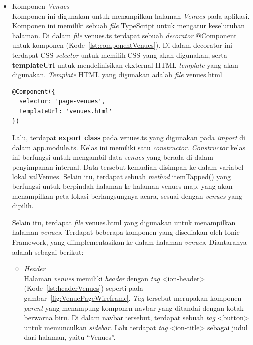 \begin{itemize}
\begin{itemize}
	\end{itemize}

	\item Komponen \textit{Venues} \\
	Komponen ini digunakan untuk menampilkan halaman \textit{Venues} pada aplikasi. Komponen ini memiliki sebuah \textit{file} TypeScript untuk mengatur keseluruhan halaman. Di dalam \textit{file} venues.ts terdapat sebuah \textit{decorator} @Component untuk komponen (Kode~\ref{lst:componentVenues}). Di dalam decorator ini terdapat CSS \textit{selector} untuk memilih CSS yang akan digunakan, serta \textbf{templateUrl} untuk mendefinisikan ekxternal HTML \textit{template} yang akan digunakan. \textit{Template} HTML yang digunakan adalah \textit{file} venues.html
	
\begin{lstlisting}[language=html, label={lst:componentVenues}, caption=@Component pada venues.ts]
@Component({
  selector: 'page-venues',
  templateUrl: 'venues.html'
})
\end{lstlisting}

	Lalu, terdapat \textbf{export class} pada venues.ts yang digunakan pada \textit{import} di dalam app.module.ts. Kelas ini memiliki satu \textit{constructor}. \textit{Constructor} kelas ini berfungsi untuk mengambil data \textit{venues} yang berada di dalam penyimpanan internal. Data tersebut kemudian disimpan ke dalam variabel lokal valVenues. Selain itu, terdapat sebuah \textit{method} itemTapped() yang berfungsi untuk berpindah halaman ke halaman venues-map, yang akan menampilkan peta lokasi berlangsungnya acara, sesuai dengan \textit{venues} yang dipilih.

	Selain itu, terdapat \textit{file} venues.html yang digunakan untuk menampilkan halaman \textit{venues}. Terdapat beberapa komponen yang disediakan oleh Ionic Framework, yang diimplementasikan ke dalam halaman \textit{venues}. Diantaranya adalah sebagai berikut:	

\newpage	
	
	\begin{itemize}
		\item \textit{Header} \\
		Halaman \textit{venues} memiliki \textit{header} dengan \textit{tag} <ion-header> (Kode~\ref{lst:headerVenues}) seperti pada gambar~\ref{fig:VenuePageWireframe}. \textit{Tag} tersebut merupakan komponen \textit{parent} yang menampung komponen navbar yang ditandai dengan kotak berwarna biru. Di dalam navbar tersebut, terdapat sebuah \textit{tag} <button> untuk memunculkan \textit{sidebar}. Lalu terdapat \textit{tag} <ion-title> sebagai judul dari halaman, yaitu ``Venues''.
		

\end{itemize}
\end{itemize}
